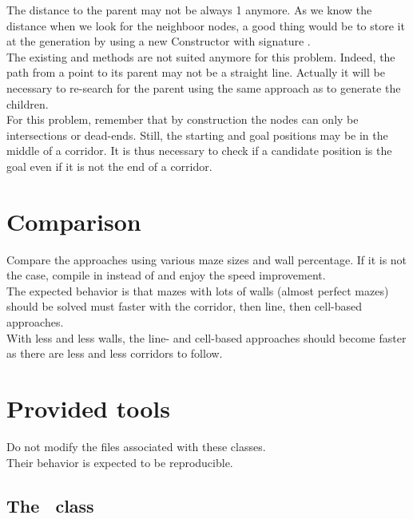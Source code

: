 \documentclass{ecnreport}
\def\maze{\okttt{ecn::Maze}~}
\begin{document}
The distance to the parent may not be always 1 anymore. As we know the distance when we look for the neighboor nodes, a good thing would be to store it 
at the generation by using a new Constructor with signature . \\

The existing  and  methods are not suited anymore for this problem. Indeed, the path from a point to its parent 
may not be a straight line. Actually it will be necessary to re-search for the parent using the same approach as to generate the children.\\

For this problem, remember that by construction the nodes can only be intersections or dead-ends. Still, the starting and goal positions may 
be in the middle of a corridor. It is thus necessary to check if a candidate position is the goal even if it is not the end of a corridor.

\section{Comparison}

Compare the approaches using various maze sizes and wall percentage.
If it is not the case, compile in  instead of  and enjoy the speed improvement.\\

The expected behavior is that mazes with lots of walls (almost perfect mazes) should be solved must faster with the corridor, then line, then cell-based approaches.\\
With less and less walls, the line- and cell-based approaches should become faster as there are less and less corridors to follow.

\appendix

\section{Provided tools}

Do not modify the files associated with these classes.\\Their behavior is expected to be reproducible.

\subsection{The \maze class}\label{mazeClass}
\end{document}

